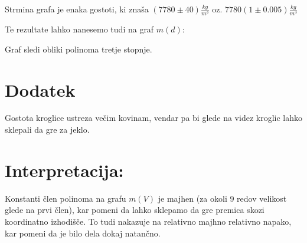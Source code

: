 \documentclass[a4paper]{article}
\begin{document}
Strmina grafa je enaka gostoti, ki znaša $(7780 \pm 40) \frac{kg}{m^3}$ oz. $7780(1 \pm 0.005) \frac{kg}{m^3}$

Te rezultate lahko nanesemo tudi na graf $m(d)$:
\datatable

\begin{center}
\end{center}

Graf sledi obliki polinoma tretje stopnje. 

\section*{Dodatek}
Gostota kroglice ustreza večim kovinam, vendar pa bi glede na videz kroglic lahko sklepali da gre za jeklo. 
\section*{Interpretacija:}

Konstanti člen polinoma na grafu $m(V)$ je majhen (za okoli 9 redov velikost glede na prvi člen), kar pomeni da lahko sklepamo da gre premica skozi koordinatno izhodišče. To tudi nakazuje na relativno majhno relativno napako, kar pomeni da je bilo dela dokaj natančno.
\end{document}
